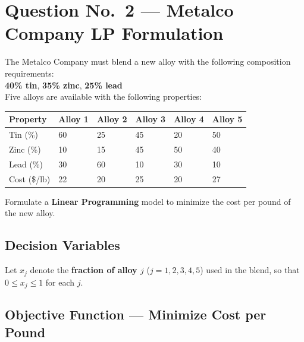 \documentclass[12pt]{article}
\newcommand{\hcell}[1]{\textbf{\color{white}#1}}
\begin{document}
\section{Question No.\ 2 --- Metalco Company LP Formulation}

\begin{problembox}
The Metalco Company must blend a new alloy with the following composition requirements:\\[4pt]
\quad\textbf{40\% tin}, \quad\textbf{35\% zinc}, \quad\textbf{25\% lead}\\[6pt]
Five alloys are available with the following properties:

\vspace{8pt}
\begin{center}
\begin{tabular}{lC{1.8cm}C{1.8cm}C{1.8cm}C{1.8cm}C{1.8cm}}
\toprule
{}
\hcell{Property} & \hcell{Alloy 1} & \hcell{Alloy 2} & \hcell{Alloy 3} & \hcell{Alloy 4} & \hcell{Alloy 5} \\
\midrule
{}
Tin (\%)       & 60 & 25 & 45 & 20 & 50 \\
Zinc (\%)      & 10 & 15 & 45 & 50 & 40 \\
Lead (\%)      & 30 & 60 & 10 & 30 & 10 \\
Cost (\$/lb)   & 22 & 20 & 25 & 20 & 27 \\
\bottomrule
\end{tabular}
\end{center}

\vspace{4pt}
Formulate a \textbf{Linear Programming} model to minimize the cost per pound of the new alloy.
\end{problembox}

\subsection*{Decision Variables}

\begin{conceptbox}
Let $x_j$ denote the \textbf{fraction of alloy $j$} ($j = 1, 2, 3, 4, 5$) used in the blend,
so that $0 \leq x_j \leq 1$ for each $j$.
\end{conceptbox}

\subsection*{Objective Function --- Minimize Cost per Pound}
\end{document}
